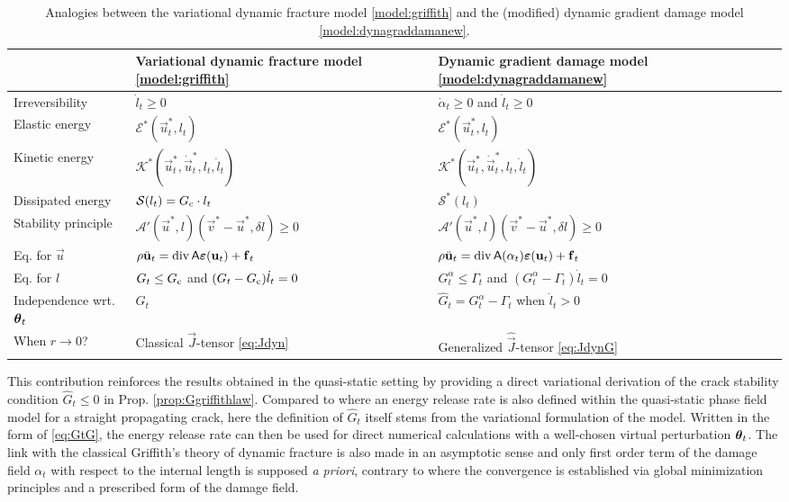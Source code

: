 \begin{table}[htbp]
\centering
\begin{tabular}{lll} \toprule
 & Variational dynamic fracture model \ref{model:griffith}  & Dynamic gradient damage model \ref{model:dynagraddamanew} \\ \midrule
Irreversibility & $\dot{l}_t\geq 0$ & $\dot{\alpha}_t\geq 0$ and $\dot{l}_t\geq 0$ \\
Elastic energy & $\mathcal{E}^*(\vec{u}^*_t,l_t)$ & $\mathcal{E}^*(\vec{u}^*_t,l_t)$ \\
Kinetic energy & $\mathcal{K}^*(\vec{u}_t^*,\dot{\vec{u}}_t^*,l_t,\dot{l}_t)$ & $\mathcal{K}^*(\vec{u}_t^*,\dot{\vec{u}}_t^*,l_t,\dot{l}_t)$ \\
Dissipated energy & $\mathcal{S}(l_t)=G_\mathrm{c}\cdot l_t$ & $\mathcal{S}^*(l_t)$ \\
Stability principle & $\mathcal{A}'(\vec{u}^*,l)(\vec{v}^*-\vec{u}^*,\delta l)\geq 0$ & $\mathcal{A}'(\vec{u}^*,l)(\vec{v}^*-\vec{u}^*,\delta l)\geq 0$ \\
Eq. for $\vec{u}$ & $\rho\ddot{\vec{u}}_t=\div\tens{A}\eps(\vec{u}_t)+\vec{f}_t$ & $\rho\ddot{\vec{u}}_t=\div\tens{A}(\alpha_t)\eps(\vec{u}_t)+\vec{f}_t$ \\
Eq. for $l$ & $G_t\leq G_\mathrm{c}$ and $(G_t-G_\mathrm{c})\dot{l}_t=0$ & $G^\alpha_t\leq \Gamma_t$ and $(G^\alpha_t-\Gamma_t)\dot{l}_t=0$ \\
Independence wrt. $\vtheta_t$ & $G_t$ & $\widehat{G}_t=G^\alpha_t-\Gamma_t$ when $\dot{l}_t>0$ \\
When $r\to 0$? & Classical $\vec{J}$-tensor \eqref{eq:Jdyn} & Generalized $\widehat{\vec{J}}$-tensor \eqref{eq:JdynG} \\ \bottomrule
\end{tabular}
\caption{Analogies between the variational dynamic fracture model \ref{model:griffith} and the (modified) dynamic gradient damage model \ref{model:dynagraddamanew}.} \label{tab:analogy}
\end{table}

This contribution reinforces the results obtained in the quasi-static setting \cite{SicsicMarigo:2013} by providing a direct variational derivation of the crack stability condition $\widehat{G}_t\leq 0$ in Prop. \ref{prop:Ggriffithlaw}. Compared to \cite{Negri:2013} where an energy release rate is also defined within the quasi-static phase field model for a straight propagating crack, here the definition of $\widehat{G}_t$ itself stems from the variational formulation of the model. Written in the form of \eqref{eq:GtG}, the energy release rate can then be used for direct numerical calculations with a well-chosen virtual perturbation $\vtheta_t$. The link with the classical Griffith's theory of dynamic fracture is also made in an asymptotic sense \cite{SicsicMarigo:2013} and only first order term of the damage field $\alpha_t$ with respect to the internal length is supposed \emph{a priori}, contrary to \cite{Negri:2013} where the convergence is established via global minimization principles and a prescribed form of the damage field.

